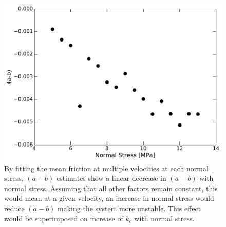 \clearpage

\begin{figure}[H]
	\centering
		\includegraphics[scale=0.6]{chap_slow_slip_details/Figure_9.pdf}
   	\caption{By fitting the mean friction at multiple velocities at each normal stress, $(a-b)$ estimates show a linear decrease in $(a-b)$ with normal stress. Assuming that all other factors remain constant, this would mean at a given velocity, an increase in normal stress would reduce $(a-b)$ making the system more unstable. This effect would be superimposed on increase of $k_c$ with normal stress.}
  	\label{Figure_9}
\end{figure}

\clearpage


